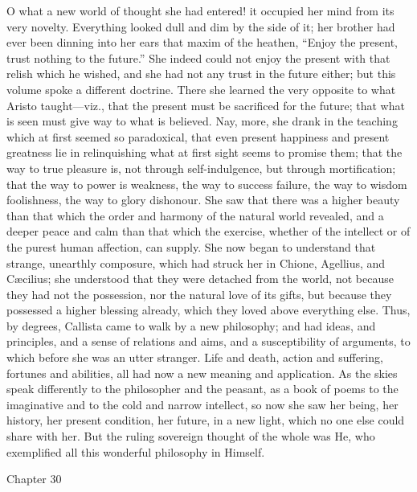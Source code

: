 O what a new world of thought she had entered! it occupied
her mind from its very novelty. Everything looked dull and dim by the
side of it; her brother had ever been dinning into her ears that maxim
of the heathen, ``Enjoy the present, trust nothing to the
future.'' She indeed could not enjoy the present with that relish
which he wished, and she had not any trust in the future either; but
this volume spoke a different doctrine. There she learned the very
opposite to what Aristo taught—viz., that the present must be
sacrificed for the future; that what is seen must give way to what is
believed. Nay, more, she drank in the teaching which at first seemed
so paradoxical, that even present happiness and present greatness lie
in relinquishing what at first sight seems to promise them; that the
way to true pleasure is, not through self-indulgence, but through
mortification; that the way to power is weakness, the way to success
failure, the way to wisdom foolishness, the way to glory dishonour.
She saw that there was a higher beauty than that which the order and
harmony of the natural world revealed, and a deeper peace and calm
than that which the exercise, whether of the intellect or of the
purest human affection, can supply. She now began to understand that
strange, unearthly composure, which had struck her in Chione, Agellius,
and Cæcilius; she understood that they were detached from the world,
not because they had not the possession, nor the natural love of its
gifts, but because they possessed a higher blessing already, which
they loved above everything else. Thus, by degrees, Callista
came to walk by a new philosophy; and had ideas, and principles, and a
sense of relations and aims, and a susceptibility of arguments, to
which before she was an utter stranger. Life and death, action and
suffering, fortunes and abilities, all had now a new meaning and
application. As the skies speak differently to the philosopher and the
peasant, as a book of poems to the imaginative and to the cold and
narrow intellect, so now she saw her being, her history, her present
condition, her future, in a new light, which no one else could share
with her. But the ruling sovereign thought of the whole was He, who
exemplified all this wonderful philosophy in Himself.

Chapter 30


